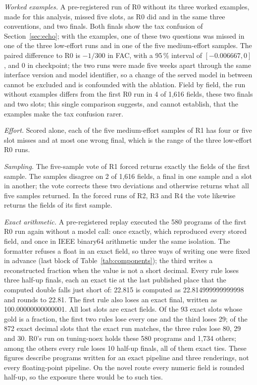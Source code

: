 \documentclass[conference]{IEEEtran}
\begin{document}
\emph{Worked examples.} A pre-registered run of R0 without its three worked examples, made for this analysis, missed five slots, as R0 did and in the same three conventions, and two finals. Both finals show the tax confusion of Section~\ref{sec:echo}; with the examples, one of these two questions was missed in one of the three low-effort runs and in one of the five medium-effort samples. The paired difference to R0 is $-1/300$ in FAC, with a 95\,\% interval of $[-0.006667,0]$, and 0 in checkpoint; the two runs were made five weeks apart through the same interface version and model identifier, so a change of the served model in between cannot be excluded and is confounded with the ablation. Field by field, the run without examples differs from the first R0 run in 4 of 1,616 fields, these two finals and two slots; this single comparison suggests, and cannot establish, that the examples make the tax confusion rarer.

\emph{Effort.} Scored alone, each of the five medium-effort samples of R1 has four or five slot misses and at most one wrong final, which is the range of the three low-effort R0 runs.

\emph{Sampling.} The five-sample vote of R1 forced returns exactly the fields of the first sample. The samples disagree on 2 of 1,616 fields, a final in one sample and a slot in another; the vote corrects these two deviations and otherwise returns what all five samples returned. In the forced runs of R2, R3 and R4 the vote likewise returns the fields of its first sample.

\emph{Exact arithmetic.} A pre-registered replay executed the 580 programs of the first R0 run again without a model call: once exactly, which reproduced every stored field, and once in IEEE binary64 arithmetic under the same isolation. The formatter refuses a float in an exact field, so three ways of writing one were fixed in advance (last block of Table~\ref{tab:components}); the third writes a reconstructed fraction when the value is not a short decimal. Every rule loses three half-up finals, each an exact tie at the last published place that the computed double falls just short of: 22.815 is computed as 22.814999999999998 and rounds to 22.81. The first rule also loses an exact final, written as 100.00000000000001. All lost slots are exact fields. Of the 93 exact slots whose gold is a fraction, the first two rules lose every one and the third loses 29; of the 872 exact decimal slots that the exact run matches, the three rules lose 80, 29 and 30. R0's run on tuning-noex holds these 580 programs and 1,734 others; among the others every rule loses 10 half-up finals, all of them exact ties. These figures describe programs written for an exact pipeline and three renderings, not every floating-point pipeline. On the novel route every numeric field is rounded half-up, so the exposure there would be to such ties.
\end{document}
